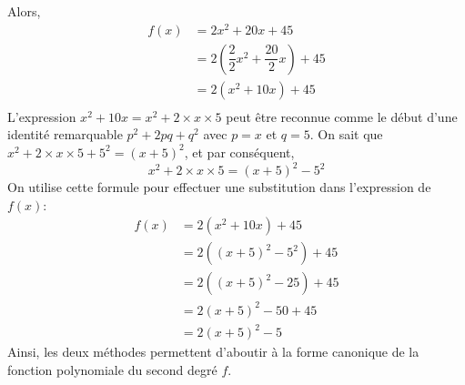 \documentclass{article}
\begin{document}
Alors,
\begin{align*}
f(x) &= 2x^2 + 20x + 45\\
&= 2(\dfrac{2}{2}x^2 + \dfrac{20}{2}x) + 45 \tag{On factorise par $a$}\\
&= 2(x^2 + 10x) + 45\\ 
\end{align*}
L'expression $x^2 + 10x = x^2 + 2 \times x \times 5$ peut être reconnue comme le début d'une identité remarquable $p^2 + 2pq + q^2$ avec $p = x$ et $q = 5$. On sait que $x^2 + 2 \times x \times 5 + 5^2 = (x + 5)^2$, et par conséquent,
\begin{equation*}
x^2 + 2 \times x \times 5 = (x + 5)^2 - 5^2
\end{equation*}
On utilise cette formule pour effectuer une substitution dans l'expression de $f(x)$:
\begin{align*}
f(x) &= 2(x^2 + 10x) + 45\\
&= 2((x + 5)^2 - 5^2) + 45\\
&= 2((x + 5)^2 - 25) + 45\\
&= 2(x+5)^2 - 50 + 45 \tag{Par distributivité}\\
&= 2(x+5)^2 - 5
\end{align*}
Ainsi, les deux méthodes permettent d'aboutir à la forme canonique de la fonction polynomiale du second degré $f$.
\end{document}
